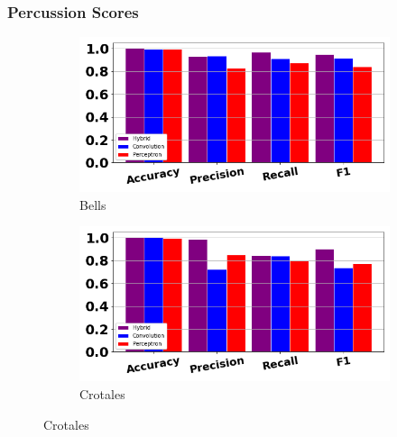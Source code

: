 \documentclass[12pt,letterpaper]{article}
\begin{document}

\subsubsection{Percussion Scores}

\begin{figure}[H]
	\begin{subfigure}[b]{0.45\textwidth}
	\centering
	\includegraphics[width=\textwidth]{../FiguresClasses/Bells}
	\caption{Bells}
	\end{subfigure}	
	\hfill
	\begin{subfigure}[b]{0.45\textwidth}
	\centering
	\includegraphics[width=\textwidth]{../FiguresClasses/Crotale}
	\caption{Crotales}
	\end{subfigure}	
	

\end{figure}
\end{document}
